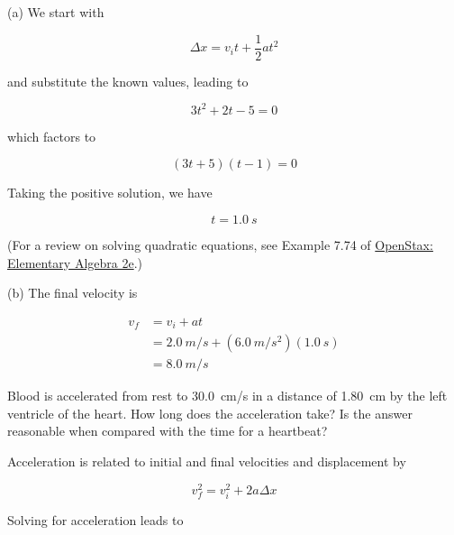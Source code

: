 \documentclass[]{exam}
\theoremstyle{definition}
\begin{document}
\begin{questions}
\begin{solution}
    (a) We start with

    \begin{equation*}
        \Delta x = v_i t + \frac{1}{2} a t^2
    \end{equation*}

    and substitute the known values, leading to

    \begin{equation*}
        3 t^2 + 2 t - 5 = 0
    \end{equation*}

    which factors to

    \begin{equation*}
        (3t + 5)(t - 1) = 0
    \end{equation*}

    Taking the positive solution, we have
    
    \begin{equation*}
        \boxed{t = \SI{1.0}{s}}
    \end{equation*}
    
    (For a review on solving quadratic equations, see Example 7.74 of \href{https://openstax.org/books/elementary-algebra-2e/pages/7-6-quadratic-equations}{OpenStax: Elementary Algebra 2e}.)\medskip

    (b) The final velocity is

    \begin{align*}
        v_f &= v_i + a t \\[1ex] 
        &= \SI{2.0}{m/s} + (\SI{6.0}{m/s^2})(\SI{1.0}{s}) \\[1ex]
        &= \boxed{\SI{8.0}{m/s}}
    \end{align*}
\end{solution}

\question \label{openstax-2.26}
Blood is accelerated from rest to \SI{30.0}{cm/s} in a distance of \SI{1.80}{cm} by the left ventricle of the heart. How long does the acceleration take? Is the answer reasonable when compared with the time for a heartbeat?

\begin{solution}
Acceleration is related to initial and final velocities and displacement by

\begin{equation*}
    v_f^2 = v_i^2 + 2a \Delta x 
\end{equation*}

Solving for acceleration leads to


\end{solution}
\end{questions}
\end{document}
